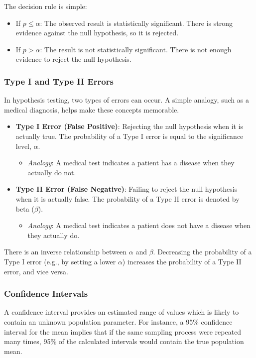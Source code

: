 \documentclass[11pt,a4paper]{article}
\begin{document}
The decision rule is simple:
\begin{itemize}
    \item If $p \le \alpha$: The observed result is statistically significant. There is strong evidence against the null hypothesis, so it is rejected.
    \item If $p > \alpha$: The result is not statistically significant. There is not enough evidence to reject the null hypothesis.
\end{itemize}

\subsubsection{Type I and Type II Errors}

In hypothesis testing, two types of errors can occur. A simple analogy, such as a medical diagnosis, helps make these concepts memorable.
\begin{itemize}
    \item \textbf{Type I Error (False Positive)}: Rejecting the null hypothesis when it is actually true. The probability of a Type I error is equal to the significance level, $\alpha$.
        \begin{itemize}
            \item \textit{Analogy}: A medical test indicates a patient has a disease when they actually do not.
        \end{itemize}
    \item \textbf{Type II Error (False Negative)}: Failing to reject the null hypothesis when it is actually false. The probability of a Type II error is denoted by beta ($\beta$).
        \begin{itemize}
            \item \textit{Analogy}: A medical test indicates a patient does not have a disease when they actually do.
        \end{itemize}
\end{itemize}

There is an inverse relationship between $\alpha$ and $\beta$. Decreasing the probability of a Type I error (e.g., by setting a lower $\alpha$) increases the probability of a Type II error, and vice versa.

\subsubsection{Confidence Intervals}

A confidence interval provides an estimated range of values which is likely to contain an unknown population parameter. For instance, a 95\% confidence interval for the mean implies that if the same sampling process were repeated many times, 95\% of the calculated intervals would contain the true population mean.
\end{document}
